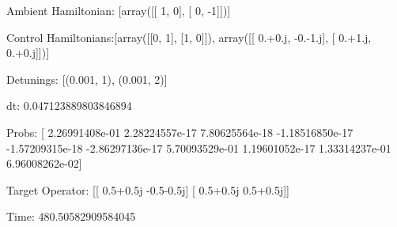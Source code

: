 \documentclass{article}
\begin{document}
    

\newpage

Ambient Hamiltonian: [array([[ 1,  0],
       [ 0, -1]])]

Control Hamiltonians:[array([[0, 1],
       [1, 0]]), array([[ 0.+0.j, -0.-1.j],
       [ 0.+1.j,  0.+0.j]])]

Detunings: [(0.001, 1), (0.001, 2)]

 dt: 0.047123889803846894

Probs: [  2.26991408e-01   2.28224557e-17   7.80625564e-18  -1.18516850e-17
  -1.57209315e-18  -2.86297136e-17   5.70093529e-01   1.19601052e-17
   1.33314237e-01   6.96008262e-02]

Target Operator: [[ 0.5+0.5j -0.5-0.5j]
 [ 0.5+0.5j  0.5+0.5j]]

Time: 480.50582909584045
\end{document}
